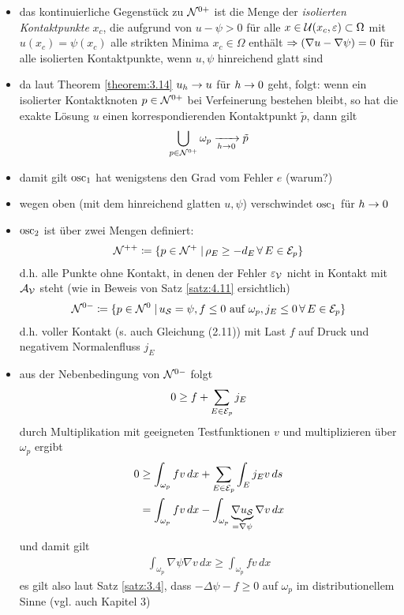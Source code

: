 \begin{itemize}
\item das kontinuierliche Gegenstück zu $\mathcal N^{0+}$ ist die Menge der \textit{isolierten Kontaktpunkte} $x_c$, die aufgrund von $u-\psi >0$ für alle $x \in \mathcal U(x_c, \varepsilon) \subset \Omega$ mit $u(x_c) = \psi(x_c)$ alle strikten Minima $x_c \in \Omega$ enthält $\Rightarrow (\nabla u -\nabla \psi) = 0$ für alle isolierten Kontaktpunkte, wenn $u, \psi$ hinreichend glatt sind

\item da laut Theorem \ref{theorem:3.14} $u_h \rightarrow u$ für $h\rightarrow 0$ geht, folgt: wenn ein isolierter Kontaktknoten $p \in \mathcal N^{0+}$ bei Verfeinerung bestehen bleibt, so hat die exakte Lösung $u$ einen korrespondierenden Kontaktpunkt $\tilde p$, dann gilt
\begin{align*}
	\bigcup_{p \in \mathcal N^{0+}} \omega_p \xrightarrow[h\rightarrow 0]{} \tilde p
\end{align*}

\item damit gilt $\operatorname{osc}_1$ hat wenigstens den Grad vom Fehler $e$ (warum?)

\item wegen oben (mit dem hinreichend glatten $u, \psi$) verschwindet $\operatorname{osc}_1$ für $h \rightarrow 0$

\item $\operatorname{osc}_2$ ist über zwei Mengen definiert:
\begin{align}
	\mathcal N^{++} \coloneqq \{p \in \mathcal N^{+}\;\vert\, \rho_E \ge - d_E \, \forall \, E \in \mathcal E_p\}
\end{align}
d.h. alle Punkte ohne Kontakt, in denen der Fehler $\varepsilon_{\mathcal V}$ nicht in Kontakt mit $\mathcal A_{\mathcal V}$ steht (wie in Beweis von Satz \ref{satz:4.11} ersichtlich)
\begin{align}
	\mathcal N^{0-}\coloneqq \{ p \in \mathcal N^0 \;\vert\, u_{\mathcal S} = \psi , f \le 0 \text{ auf } \omega_p, j_E \le 0 \, \forall \, E \in \mathcal E_p \}
\end{align}
d.h. voller Kontakt (s. auch \cite{SiebVee} Gleichung (2.11)) mit Last $f$ auf Druck und negativem Normalenfluss $j_E$

\item aus der Nebenbedingung von $\mathcal N^{0-}$ folgt
\begin{align*}
	0 \ge f + \sum_{E \in \mathcal E_p} j_E
\end{align*}
durch Multiplikation mit geeigneten Testfunktionen $v$ und multiplizieren über $\omega_p$ ergibt
\begin{align*}
	0 &  \ge \int_{\omega_p} f v \, dx + \sum_{E\in \mathcal E_p} \int_E j_E v \, ds \\
	& = \int_{\omega_p} f v \, dx - \int_{\omega_p} \underbrace{\nabla u_{\mathcal S}}_{=\nabla \psi} \nabla v \, dx
\end{align*}
und damit gilt
\begin{align}
	 \int_{\omega_p} {\nabla \psi} \nabla v \, dx \ge \int_{\omega_p} f v \, dx
\end{align}
es gilt also laut Satz \ref{satz:3.4}, dass $-\Delta \psi - f \ge 0$ auf $\omega_p$ im distributionellem Sinne (vgl. auch \cite{Walker} Kapitel 3)


\end{itemize}
